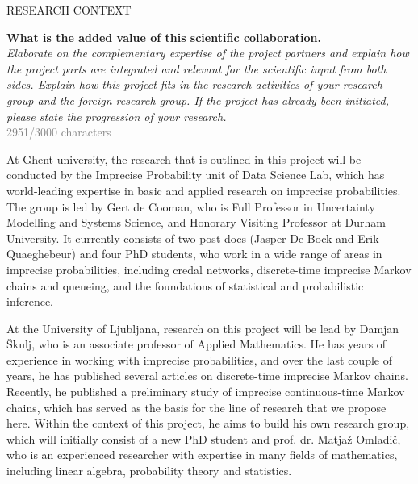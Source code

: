 \documentclass[11pt,dvipsnames,usenames,a4paper]{article}
\begin{document}


\vspace{7pt}




\vspace{5mm}

\begin{shaded}\centering RESEARCH CONTEXT \end{shaded}
\textbf{What is the added value of this scientific collaboration.}\\
\textit{Elaborate on the complementary expertise of the project partners and explain how the project parts are integrated and relevant for the scientific input from both sides. Explain how this project fits in the research activities of your research group and the foreign research group. If the project has already been initiated, please state the progression of your research.}\\
\textcolor{Gray}{2951/3000 characters}

At Ghent university, the research that is outlined in this project will be conducted by the Imprecise Probability unit of Data Science Lab, which has world-leading expertise in basic and applied research on imprecise probabilities.
The group is led by Gert de Cooman, who is Full Professor in Uncertainty Modelling and Systems Science, and Honorary Visiting Professor at Durham University.
It currently consists of two post-docs (Jasper De Bock and Erik Quaeghebeur) and four PhD students, who work in a wide range of areas in imprecise probabilities, including credal networks, discrete-time imprecise Markov chains and queueing, and the foundations of statistical and probabilistic inference.

At the University of Ljubljana, research on this project will be lead by Damjan \v Skulj, who is an associate professor of Applied Mathematics. He has years of experience in working with imprecise probabilities, and over the last couple of years, he has published several articles on discrete-time imprecise Markov chains. 
Recently, he published a preliminary study of imprecise continuous-time Markov chains, which has served as the basis for the line of research that we propose here.
Within the context of this project, he aims to build his own research group, which will initially consist of a new PhD student and prof. dr. Matja\v z Omladi\v c, who is an experienced researcher with expertise in many fields of mathematics, including linear algebra, probability theory and statistics.
\end{document}
